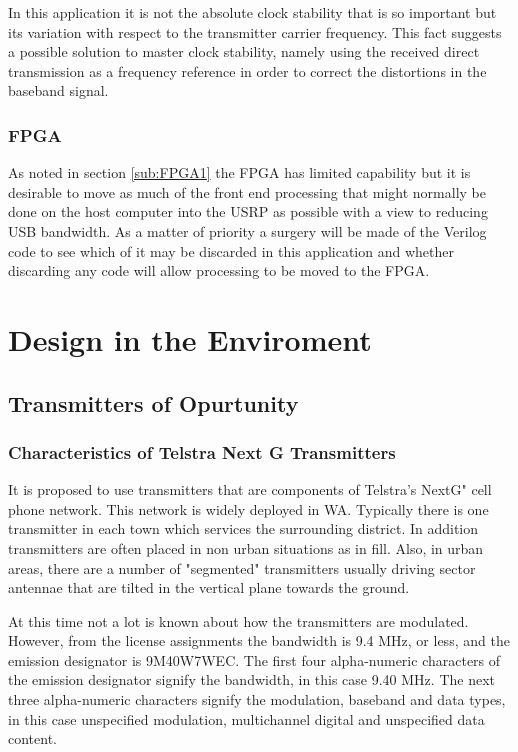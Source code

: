 \documentclass[a4paper]{report}
\numberwithin{equation}{chapter}
\begin{document}
\bigskip

In this application it is not the absolute clock stability that is so important but its variation with respect to the transmitter carrier frequency. This fact suggests a possible solution to master clock stability, namely using the received direct transmission as a frequency reference in order to correct the distortions in the baseband signal.

\subsection{FPGA}

As noted in section \ref{sub:FPGA1} the FPGA has limited capability but it is desirable to move as much of the front end processing that might normally be done on the host computer into the USRP as possible with a view to reducing USB bandwidth. As a matter of priority a surgery will be made of the Verilog code to see which of it may be discarded in this application and whether discarding any code will allow processing to be moved to the FPGA.

\clearpage\setcounter{page}{1}
\chapter[Design in the Enviroment]{Design in the Enviroment}

\section[Transmitters of Opurtunity]{Transmitters of Opurtunity}

\subsection[Characteristics of Telstra Next G Transmitters]{Characteristics of Telstra Next G Transmitters}
\label{sub:Telstra}

It is proposed to use transmitters that are components of Telstra's NextG" cell phone network. This network is widely deployed in WA. Typically there is one transmitter in each town which services the surrounding district. In addition transmitters are often placed in non urban situations as in fill. Also, in urban areas, there are a number of "segmented" transmitters usually driving sector antennae 
that are tilted in the vertical plane towards the ground.

\bigskip

At this time not a lot is known about how the transmitters are modulated. However, from the license assignments the bandwidth is 9.4 MHz, or less, and the emission designator is 9M40W7WEC. The first four alpha-numeric characters of the emission designator signify the bandwidth, in this case 9.40 MHz. The next three alpha-numeric characters signify the modulation, baseband and data types, in this case unspecified modulation, multichannel digital and unspecified data content.
\end{document}
